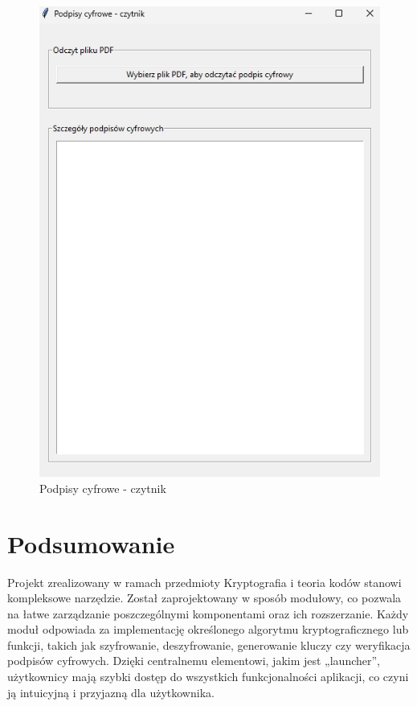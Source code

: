 \documentclass[12pt,a4paper]{article}
\begin{document}
\begin{figure}[!htb]
\begin{center}
\includegraphics[scale=0.45]{pictures/podpisy.png}
\caption{Podpisy cyfrowe - czytnik}
\label{fig:Podpisy cyfrowe - czytnik}
\end{center}
\end{figure}


\newpage
\section{Podsumowanie}
\noindent Projekt zrealizowany w ramach przedmioty Kryptografia i teoria kodów stanowi kompleksowe narzędzie. Został zaprojektowany w sposób modułowy, co pozwala na łatwe zarządzanie poszczególnymi komponentami oraz ich rozszerzanie. Każdy moduł odpowiada za implementację określonego algorytmu kryptograficznego lub funkcji, takich jak szyfrowanie, deszyfrowanie, generowanie kluczy czy weryfikacja podpisów cyfrowych. Dzięki centralnemu elementowi, jakim jest „launcher”, użytkownicy mają szybki dostęp do wszystkich funkcjonalności aplikacji, co czyni ją intuicyjną i przyjazną dla użytkownika.\newline
\end{document}
